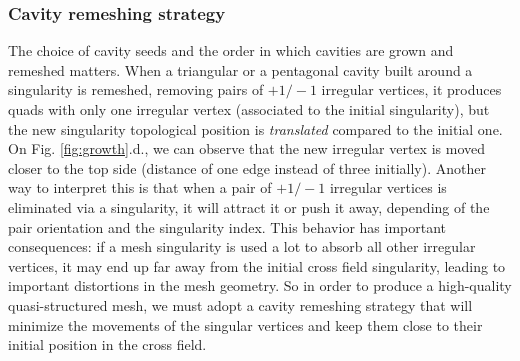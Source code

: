 \documentclass[AMA,STIX1COL]{WileyNJD-v2}
\newcommand\rfig[1]{Fig. \ref{#1}}
\begin{document}
{\subsubsection{Cavity remeshing strategy}
\label{ss:strategy}

The choice of cavity seeds and the order in which cavities are grown and remeshed
matters. When a triangular or a pentagonal cavity built around a singularity is 
remeshed, removing pairs of $+1/-1$ irregular vertices, it produces
quads with only one irregular vertex (associated to the initial singularity),
but the new singularity topological position is \emph{translated} compared
to the initial one. On \rfig{fig:growth}.d., we can observe that the new
irregular vertex is moved closer to the top side (distance of one edge instead
of three initially). Another way to interpret this is that when a pair of $+1/-1$ irregular vertices
is eliminated via a singularity, it will attract it or push it away, depending
of the pair orientation and the singularity index.
This behavior has important consequences: if a mesh singularity is used a lot to
absorb all other irregular vertices, it may end up far away from the initial
cross field singularity, leading to important distortions in the mesh geometry.
So in order to produce a high-quality quasi-structured mesh, we must adopt
a cavity remeshing strategy that will minimize the movements of the
singular vertices and keep them close to their initial position in the cross field.

}
\end{document}

